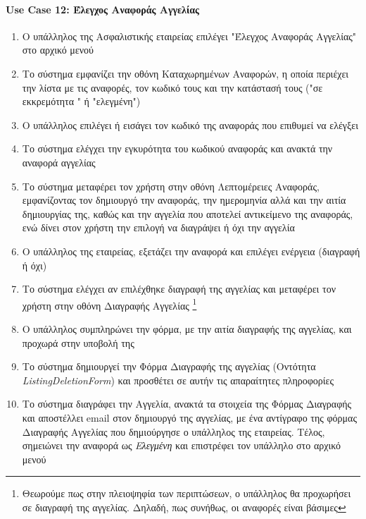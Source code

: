 \documentclass{../ol-softwaremanual}
\begin{document}
	\newpage
	\centering
	
	\paragraph{\en Use Case 12: \gr Έλεγχος Αναφοράς Αγγελίας} 
	
	\begin{enumerate}
		\item Ο υπάλληλος της Ασφαλιστικής εταιρείας επιλέγει \en"\gr Έλεγχος Αναφοράς Αγγελίας\en" \gr στο αρχικό μενού
		\item Το σύστημα εμφανίζει την οθόνη Καταχωρημένων Αναφορών, η οποία περιέχει την λίστα με τις αναφορές, τον κωδικό τους και την κατάστασή τους (\en"\gr σε εκκρεμότητα \en" \gr ή \en"\gr ελεγμένη\en"\gr)
		\item Ο υπάλληλος επιλέγει ή εισάγει τον κωδικό της αναφοράς που επιθυμεί να ελέγξει 
		\item Το σύστημα ελέγχει την εγκυρότητα του κωδικού αναφοράς και ανακτά την αναφορά αγγελίας
		\item Το σύστημα μεταφέρει τον χρήστη στην οθόνη Λεπτομέρειες Αναφοράς, εμφανίζοντας τον δημιουργό την αναφοράς, την ημερομηνία αλλά και την αιτία δημιουργίας της, καθώς και την αγγελία που αποτελεί αντικείμενο της αναφοράς, ενώ δίνει στον χρήστη την επιλογή να διαγράψει ή όχι την αγγελία
		\item Ο υπάλληλος της εταιρείας, εξετάζει την αναφορά και επιλέγει ενέργεια (διαγραφή ή όχι)
		\item Το σύστημα ελέγχει αν επιλέχθηκε διαγραφή της αγγελίας και μεταφέρει τον χρήστη στην οθόνη Διαγραφής Αγγελίας \footnote[5]{Θεωρούμε πως στην πλειοψηφία των περιπτώσεων, ο υπάλληλος θα προχωρήσει σε διαγραφή της αγγελίας. Δηλαδή, πως συνήθως, οι αναφορές είναι βάσιμες}
		\item Ο υπάλληλος συμπληρώνει την φόρμα, με την αιτία διαγραφής της αγγελίας, και προχωρά στην υποβολή της
		\item Το σύστημα δημιουργεί την Φόρμα Διαγραφής της αγγελίας (Οντότητα \en \textit{ListingDeletionForm}\gr) και προσθέτει σε αυτήν τις απαραίτητες πληροφορίες
		\item Το σύστημα διαγράφει την Αγγελία, ανακτά τα στοιχεία της Φόρμας Διαγραφής και αποστέλλει \en email \gr στον δημιουργό της αγγελίας, με ένα αντίγραφο της φόρμας Διαγραφής Αγγελίας που δημιούργησε ο υπάλληλος της εταιρείας. Τέλος, σημειώνει την αναφορά ως \textit{Ελεγμένη} και επιστρέφει τον υπάλληλο στο αρχικό μενού
	\end{enumerate}
	
\end{document}
